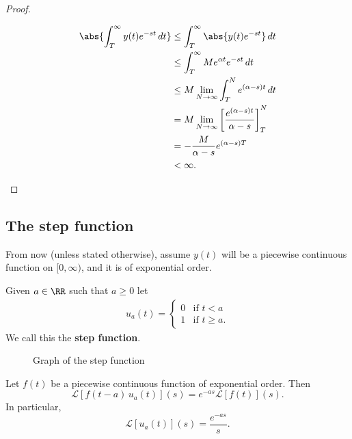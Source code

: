 \documentclass[12pt, a4paper]{article}
\newcommand{\CL}{\mathcal{L}}
\begin{document}
\begin{proof}
\begin{itemize}
        \[\begin{aligned}
            \abs{\int_{T}^{\infty} y(t) e^{-st} \, dt} &\leq \int_{T}^{\infty} \abs{y(t) e^{-st}} \, dt \\
            &\leq \int_{T}^{\infty} Me^{\alpha t} e^{-st} \, dt \\
            &\leq M \lim_{N \to \infty} \int_{T}^{N} e^{(\alpha-s)t} \, dt \\
            &=M \lim_{N \to \infty} \left[ \frac{e^{(\alpha-s)t}}{\alpha-s} \right]_T^N \\
            &= -\frac{M}{\alpha -s} e^{(\alpha-s)T} \\
            &< \infty.
        \end{aligned}\]
    \end{itemize}
\end{proof}

\subsection{The step function}

From now (unless stated otherwise), assume \(y(t)\) will be a piecewise continuous function on \([0,\infty)\), and it is of exponential order.

\begin{definition}
    Given \(a \in \RR\) such that \(a \geq 0\) let 
    \[\begin{aligned}
        u_a(t) = \begin{cases}
            0 &\text{if } t < a \\
            1 &\text{if } t \geq a.
        \end{cases}
    \end{aligned}\]
    We call this the \textbf{step function}.
\end{definition}

\begin{figure}[H]
     \begin{center}
         
     \end{center}
     \caption{Graph of the step function}
\end{figure}

\begin{mdprop}
    Let \(f(t)\) be a piecewise continuous function of exponential order. Then 
    \[\CL \left[ f(t-a) \, u_a(t) \right](s) = e^{-as} \CL[f(t)](s).\]
    In particular,
    \[\CL\left[ u_a(t) \right](s) = \frac{e^{-as}}{s}.\]
\end{mdprop}
\end{document}

